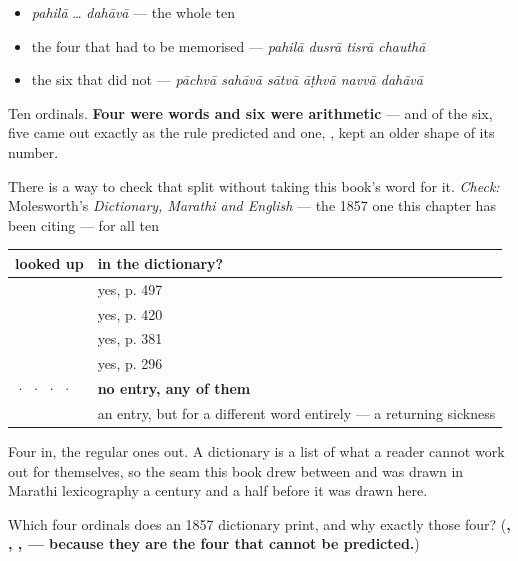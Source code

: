 \begin{itemize}
\raggedright
  \item \emph{pahilā} … \emph{dahāvā} — the whole ten
  \item the four that had to be memorised — \emph{pahilā dusrā tisrā chauthā}
  \item the six that did not — \emph{pāchvā sahāvā sātvā āṭhvā navvā dahāvā}
\end{itemize}

\begin{grammarlens}[title={What you've built across these two chapters}]
Ten ordinals. \textbf{Four were words and six were arithmetic} — and of the six, five came out exactly as the rule predicted and one, \textbf{}, kept an older shape of its number.

There is a way to check that split without taking this book's word for it. \emph{Check:} Molesworth's \emph{Dictionary, Marathi and English} — the 1857 one this chapter has been citing — for all ten

\noindent
\begin{tabularx}{\linewidth}{@{}>{\raggedright\arraybackslash}X>{\raggedright\arraybackslash}X@{}}
\toprule
\textbf{looked up} & \textbf{in the dictionary?} \\
\midrule
\textbf{\mr{पहिला}} & yes, p. 497 \\
\textbf{\mr{दुसरा}} & yes, p. 420 \\
\textbf{\mr{तिसरा}} & yes, p. 381 \\
\textbf{\mr{चौथा}} & yes, p. 296 \\
\textbf{\mr{सहावा}} · \textbf{\mr{सातवा}} · \textbf{\mr{आठवा}} · \textbf{\mr{नववा}} · \textbf{\mr{दहावा}} & \textbf{no entry, any of them} \\
\textbf{\mr{पाचवा}} & an entry, but for a different word entirely — a returning sickness \\
\bottomrule
\end{tabularx}

Four in, the regular ones out. A dictionary is a list of what a reader cannot work out for themselves, so the seam this book drew between \textbf{} and \textbf{} was drawn in Marathi lexicography a century and a half before it was drawn here.
\end{grammarlens}

\begin{tcolorbox}[breakable,colback=teal!4,colframe=teal!35!black,title={Before you move on}]
Which four ordinals does an 1857 dictionary print, and why exactly those four? (\textbf{, , ,  — because they are the four that cannot be predicted.})
\end{tcolorbox}
